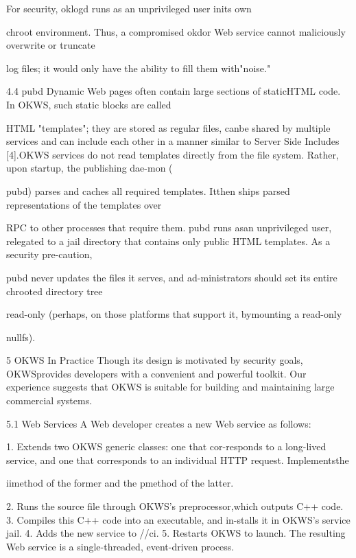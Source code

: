 For security, oklogd runs as an unprivileged user inits own

chroot environment. Thus, a compromised okdor Web service cannot maliciously overwrite or truncate

log files; it would only have the ability to fill them with"noise."

4.4 pubd
Dynamic Web pages often contain large sections of staticHTML code. In OKWS, such static blocks are called

HTML "templates"; they are stored as regular files, canbe shared by multiple services and can include each other
in a manner similar to Server Side Includes [4].OKWS services do not read templates directly from
the file system. Rather, upon startup, the publishing dae-mon (

pubd) parses and caches all required templates. Itthen ships parsed representations of the templates over

RPC to other processes that require them. pubd runs asan unprivileged user, relegated to a jail directory that contains only public HTML templates. As a security pre-caution,

pubd never updates the files it serves, and ad-ministrators should set its entire chrooted directory tree

read-only (perhaps, on those platforms that support it, bymounting a read-only

nullfs).

5 OKWS In Practice
Though its design is motivated by security goals, OKWSprovides developers with
a convenient and powerful toolkit.
Our experience suggests that OKWS is suitable for building and maintaining large
commercial systems.

5.1 Web Services
A Web developer creates a new Web service as follows:

1. Extends two OKWS generic classes: one that cor-responds to a long-lived service, and one that corresponds to an individual HTTP request. Implementsthe

i\Gamma i\Delta  method of the former and the p\Theta \Lambda \Xi \Pi \Sigma \Sigma method of the latter.

2. Runs the source file through OKWS's preprocessor,which outputs C++ code.
3. Compiles this C++ code into an executable, and in-stalls it in OKWS's service jail.
4. Adds the new service to /\Pi \Delta \Xi /\Lambda \Upsilon \Phi \Sigma  \Xi \Lambda \Gamma ci\Psi .
5. Restarts OKWS to launch.
The resulting Web service is a single-threaded, event-driven process.

